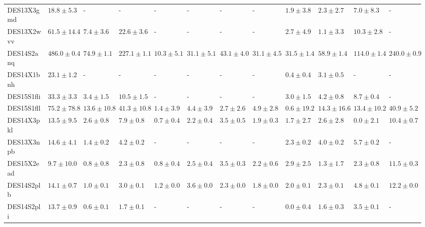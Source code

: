 \documentclass[fleqn,usenatbib,]{mnras}
\begin{document}
\begin{table}
\begin{tabular}{llllllllllll}
DES13X3gmd &   $18.8 \pm 5.3$ &                - &                 - &               - &               - &               - &               - &   $1.9 \pm 3.8$ &    $2.3 \pm 2.7$ &    $7.0 \pm 8.3$ &                - \\
DES13X2wvv &  $61.5 \pm 14.4$ &    $7.4 \pm 3.6$ &    $22.6 \pm 3.6$ &               - &               - &               - &               - &   $2.7 \pm 4.9$ &    $1.1 \pm 3.3$ &   $10.3 \pm 2.8$ &                - \\
DES14S2anq &  $486.0 \pm 0.4$ &   $74.9 \pm 1.1$ &   $227.1 \pm 1.1$ &  $10.3 \pm 5.1$ &  $31.1 \pm 5.1$ &  $43.1 \pm 4.0$ &  $31.1 \pm 4.5$ &  $31.5 \pm 1.4$ &   $58.9 \pm 1.4$ &  $114.0 \pm 1.4$ &  $240.0 \pm 0.9$ \\
DES14X1bnh &   $23.1 \pm 1.2$ &                - &                 - &               - &               - &               - &               - &   $0.4 \pm 0.4$ &    $3.1 \pm 0.5$ &                - &                - \\
DES15S1fli &   $33.3 \pm 3.3$ &    $3.4 \pm 1.5$ &    $10.5 \pm 1.5$ &               - &               - &               - &               - &   $3.0 \pm 1.5$ &    $4.2 \pm 0.8$ &    $8.7 \pm 0.4$ &                - \\
DES15S1fll &  $75.2 \pm 78.8$ &  $13.6 \pm 10.8$ &   $41.3 \pm 10.8$ &   $1.4 \pm 3.9$ &   $4.4 \pm 3.9$ &   $2.7 \pm 2.6$ &   $4.9 \pm 2.8$ &  $0.6 \pm 19.2$ &  $14.3 \pm 16.6$ &  $13.4 \pm 10.2$ &   $40.9 \pm 5.2$ \\
DES14X3pkl &   $13.5 \pm 9.5$ &    $2.6 \pm 0.8$ &     $7.9 \pm 0.8$ &   $0.7 \pm 0.4$ &   $2.2 \pm 0.4$ &   $3.5 \pm 0.5$ &   $1.9 \pm 0.3$ &   $1.7 \pm 2.7$ &    $2.6 \pm 2.8$ &    $0.0 \pm 2.1$ &   $10.4 \pm 0.7$ \\
DES13X3npb &   $14.6 \pm 4.1$ &    $1.4 \pm 0.2$ &     $4.2 \pm 0.2$ &               - &               - &               - &               - &   $2.3 \pm 0.2$ &    $4.0 \pm 0.2$ &    $5.7 \pm 0.2$ &                - \\
DES15X2ead &   $9.7 \pm 10.0$ &    $0.8 \pm 0.8$ &     $2.3 \pm 0.8$ &   $0.8 \pm 0.4$ &   $2.5 \pm 0.4$ &   $3.5 \pm 0.3$ &   $2.2 \pm 0.6$ &   $2.9 \pm 2.5$ &    $1.3 \pm 1.7$ &    $2.3 \pm 0.8$ &   $11.5 \pm 0.3$ \\
DES14S2plb &   $14.1 \pm 0.7$ &    $1.0 \pm 0.1$ &     $3.0 \pm 0.1$ &   $1.2 \pm 0.0$ &   $3.6 \pm 0.0$ &   $2.3 \pm 0.0$ &   $1.8 \pm 0.0$ &   $2.0 \pm 0.1$ &    $2.3 \pm 0.1$ &    $4.8 \pm 0.1$ &   $12.2 \pm 0.0$ \\
DES14S2pli &   $13.7 \pm 0.9$ &    $0.6 \pm 0.1$ &     $1.7 \pm 0.1$ &               - &               - &               - &               - &   $0.0 \pm 0.4$ &    $1.6 \pm 0.3$ &    $3.5 \pm 0.1$ &                - \\

\end{tabular}
\end{table}
\end{document}
